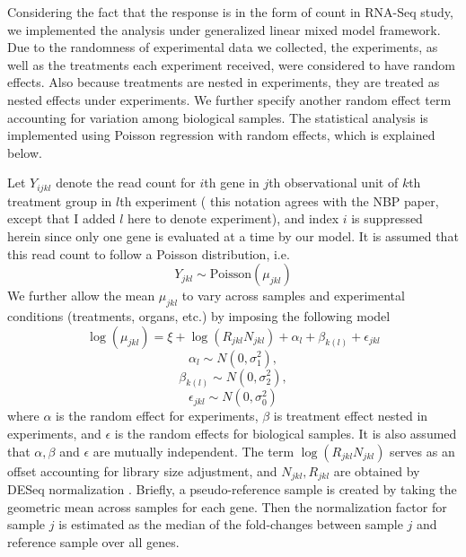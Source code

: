 \documentclass[11pt, a4paper]{article}
\begin{document}
Considering the fact that the response is in the form of count in RNA-Seq study, we implemented the analysis under generalized linear mixed model framework\nocite{mccullagh1989generalized}. Due to the randomness of experimental data we collected, the experiments, as well as the treatments each experiment received, were considered to have random effects. Also because treatments are nested in experiments, they are treated as nested effects under experiments. We further specify another random effect term accounting for variation among biological samples.  The statistical analysis is implemented using Poisson regression with random effects, which is explained below.

Let $Y_{ijkl}$ denote the read count for $i$th gene in $j$th observational unit of $k$th treatment group in $l$th experiment ( {\color{red} this notation agrees with the NBP paper, except that I added $l$ here to denote experiment}), and index $i$ is suppressed herein since only one gene is evaluated at a time by our model. It is assumed that this read count to follow a Poisson distribution, i.e.  
  \[Y_{jkl}\sim \text{Poisson}(\mu_{jkl})\]
  We further allow the mean $\mu_{jkl}$ to vary across samples and experimental conditions (treatments, organs, etc.) by imposing the following model 
  \begin{equation}\label{q1}
   \log( \mu_{jkl}) = \xi + \log(R_{jkl}N_{jkl})+ \alpha_l + \beta_{k(l)} + \epsilon_{jkl} 
  \end{equation}
  \[\alpha_l\sim N(0, \sigma^2_1),\] 
  \[\beta_{k(l)}\sim N(0, \sigma^2_2),\]
   \[\epsilon_{jkl}\sim N(0, \sigma_0^2)\]
  where $\alpha$  is the random effect for experiments,  $\beta$ is treatment effect nested in experiments, and $\epsilon$ is the random effects for biological samples. It is also assumed that $\alpha, \beta$ and $\epsilon$ are mutually independent. The term $\log(R_{jkl}N_{jkl})$ serves as an offset accounting for library size adjustment, and $N_{jkl}, R_{jkl}$ are obtained by DESeq normalization \citep{anders2010differential}. Briefly, a pseudo-reference sample is created by taking the geometric mean across samples for each gene. Then the normalization factor for sample $j$ is estimated as the median of the fold-changes between sample $j$ and reference sample over all genes. \\
  
\end{document}
